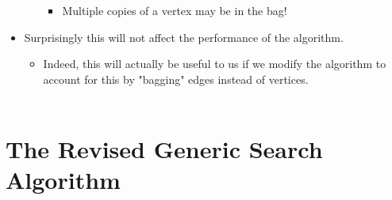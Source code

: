 \documentclass[12pt]{article}
\begin{document}
\begin{itemize}
\begin{itemize}
		\begin{itemize}
		\item Multiple copies of a vertex may be in the bag!
		\end{itemize}
	\end{itemize}
\item Surprisingly this will not affect the performance of the algorithm.
	\begin{itemize}
	\item Indeed, this will actually be useful to us if we modify the algorithm to account for this by "bagging" edges instead of vertices.
	\\
	\\
	\end{itemize}
\end{itemize}

\section{The Revised Generic Search Algorithm}
\renewcommand{\labelitemii}{$\circ$}
\renewcommand{\labelitemiii}{$\cdot$}
\renewcommand{\labelitemiii}{$\rightarrow$}
\renewcommand{\labelitemiv}{$\star$}
\end{document}
